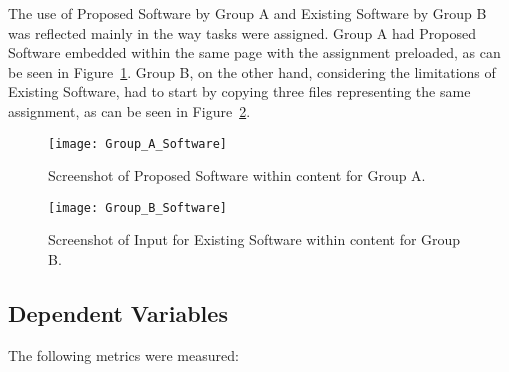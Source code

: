 The use of Proposed Software by Group A and Existing Software by Group B was reflected mainly in the way tasks were assigned.
Group A had Proposed Software embedded within the same page with the assignment preloaded, as can be seen in Figure~\ref{fig:group-a-software}.
Group B, on the other hand, considering the limitations of Existing Software, had to start by copying three files representing the same assignment, as can be seen in Figure~\ref{fig:group-b-software}.

\begin{figure}[ht]
    \centering
    \texttt{[image: Group\_A\_Software]}
    \caption{Screenshot of Proposed Software within content for Group A.}
    \label{fig:group-a-software}
\end{figure}

\begin{figure}[ht]
    \centering
    \texttt{[image: Group\_B\_Software]}
    \caption{Screenshot of Input for Existing Software within content for Group B.}
    \label{fig:group-b-software}
\end{figure}

\subsection{Dependent Variables}

The following metrics were measured:

